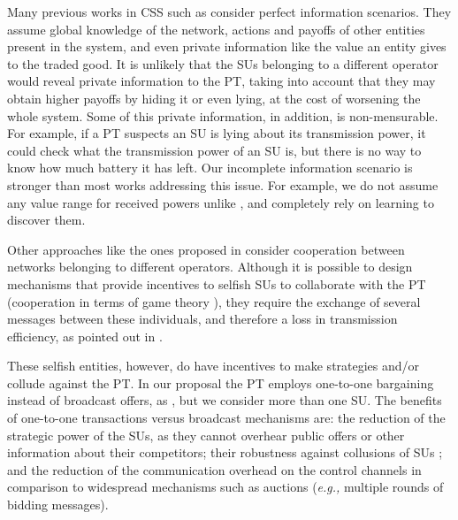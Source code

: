 Many previous works in CSS such as \cite{ref:Simeone2008,ref:Zhang2009,ref:Yi2010,ref:Nadkar2011} consider perfect information scenarios. 
They assume global knowledge of the network, actions and payoffs of other entities present in the system, and even private information like the value an entity gives to the traded good.
It is unlikely that the SUs belonging to a different operator would reveal private information to the PT, taking into account that they may obtain higher payoffs by hiding it or even lying, at the cost of worsening the whole system. 
Some of this private information, in addition, is non-mensurable. For example, if a PT suspects an SU is lying about its transmission power, it could check what the transmission power of an SU is, but there is no way to know how much battery it has left. 
Our incomplete information scenario is stronger than most works addressing this issue. 
For example, we do not assume any value range for received powers unlike \cite{ref:Feng2014}, and completely rely on learning to discover them. 

Other approaches like the ones proposed in \cite{ref:Yuan2013,ref:Han2010,ref:Li2011} consider cooperation between networks belonging to different operators. 
Although it is possible to design mechanisms that provide incentives to selfish SUs to collaborate with the PT (cooperation in terms of game theory \cite{ref:Zhang2012_Fair}), they require the exchange of several messages between these individuals, and therefore a loss in transmission efficiency, as pointed out in \cite{ref:Niyato2008}.

These selfish entities, however, do have incentives to make strategies and/or collude against the PT. 
In our proposal the PT employs one-to-one bargaining instead of broadcast offers, as \cite{ref:Yan2013}, but we consider more than one SU. The benefits of one-to-one transactions versus broadcast mechanisms \cite{ref:Feng2014,ref:Duan2014,ref:Jayaweera2011,ref:Zhang2009,ref:Simeone2008} are: the reduction of the strategic power of the SUs, as they cannot overhear public offers or other information about their competitors; their robustness against collusions of SUs \cite{ref:Alcaraz2014_coa}; and the reduction of the communication overhead on the control channels in comparison to widespread mechanisms such as auctions \cite{ref:Feng2014, ref:Jayaweera2011} (\textit{e.g.,} multiple rounds of bidding messages).
 

